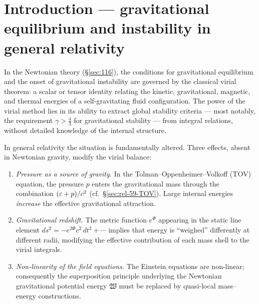 %

\section{Introduction --- gravitational equilibrium and instability
  in general relativity}
\label{sec:rel-116}

In the Newtonian theory (\S\ref{sec:116}), the conditions for
gravitational equilibrium and the onset of gravitational instability
are governed by the classical virial theorem: a scalar or tensor
identity relating the kinetic, gravitational, magnetic, and thermal
energies of a self-gravitating fluid configuration.  The power of the
virial method lies in its ability to extract global stability criteria
--- most notably, the requirement $\gamma > \tfrac{4}{3}$ for
gravitational stability --- from integral relations, without detailed
knowledge of the internal structure.

In general relativity the situation is fundamentally altered.  Three
effects, absent in Newtonian gravity, modify the virial balance:
\begin{enumerate}
\item \emph{Pressure as a source of gravity.}  In the
  Tolman--Oppenheimer--Volkoff (TOV) equation, the pressure $p$ enters
  the gravitational mass through the combination $(\varepsilon + p)/c^{2}$
  (cf.\ \S\ref{sec:rel-59-TOV}).  Large internal energies \emph{increase}
  the effective gravitational attraction.
\item \emph{Gravitational redshift.}  The metric function $e^{\Phi}$
  appearing in the static line element
  $ds^{2} = -e^{2\Phi}c^{2}\,dt^{2} + \cdots$ implies that energy is
  ``weighed'' differently at different radii, modifying the effective
  contribution of each mass shell to the virial integrals.
\item \emph{Non-linearity of the field equations.}  The Einstein
  equations are non-linear; consequently the superposition principle
  underlying the Newtonian gravitational potential energy
  $\mathfrak{W}$ must be replaced by quasi-local mass--energy
  constructions.
\end{enumerate}

